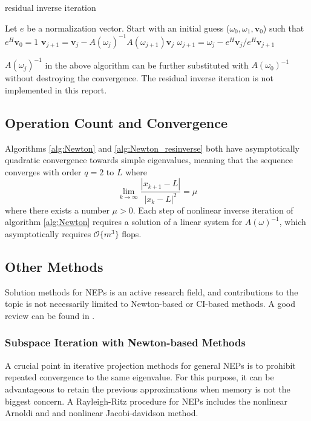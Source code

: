 \documentclass[final,leqno,onefignum,onetabnum]{siamltex1213}
\begin{document}
\begin{algorithm}
\caption{residual inverse iteration}
\label{alg:Newton_resinverse}
\begin{algorithmic}
\STATE Let $e$ be a normalization vector. Start with an initial guess ($\omega_0, \omega_1, \mathbf{v}_0$) such that $e^{H}\mathbf{v}_0=1$ 
\STATE $\mathbf{v}_{j+1} = \mathbf{v}_j- A(\omega_j)^{-1} A(\omega_{j+1})\mathbf{v}_j $
\STATE $\omega_{j+1} = \omega_j - e^H\mathbf{v}_j/e^H\mathbf{v}_{j+1} $
\ENDFOR
\end{algorithmic}
\end{algorithm}
$A(\omega_j)^{-1}$ in the above algorithm can be further substituted with $A(\omega_0)^{-1}$ without destroying the convergence. The residual inverse iteration is not implemented in this report. 

\subsection{Operation Count and Convergence}
Algorithms \ref{alg:Newton} and \ref{alg:Newton_resinverse} both 
have asymptotically quadratic convergence towards simple eigenvalues, meaning that the sequence converges with order $q=2$ to $L$ where 
\begin{equation}\label{eq:quadconv}
    \lim_{k \to \infty} \frac{|x_{k+1}-L|}{|x_k-L|^{2}} = \mu 
\end{equation}
where there exists a number $\mu>0$. Each step of nonlinear inverse iteration of algorithm \ref{alg:Newton} requires a solution of a linear system for $A(\omega)^{-1}$, which asymptotically requires $\mathcal{O}\{m^3\}$ flops. 

\subsection{Other Methods}
Solution methods for NEPs is an active research field, and contributions to the topic is not necessarily limited to Newton-based or CI-based methods. A good review can be found in \citep{effenberger_robust_2013}. 
\subsubsection{Subspace Iteration with Newton-based Methods}
A crucial point in iterative projection methods for general NEPs is to  prohibit repeated convergence to  the same eigenvalue. For this purpose, it can be advantageous to retain the previous approximations when memory is not the biggest concern. A Rayleigh-Ritz procedure for NEPs includes the nonlinear Arnoldi and \citep{voss2004arnoldi} and nonlinear Jacobi-davidson \citep{mehrmann2004nonlinear, voss2007jacobi} method. 
\end{document}
